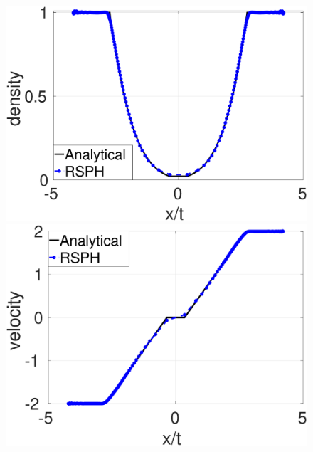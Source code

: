 \begin{figure}[H]
    \begin{minipage}{.495\textwidth}
        \centering
        \includegraphics[width=0.99 \textwidth]{Chapter-4/Figures/Sjogreen/Sjogreen-RCM-rho-Adpt1}
    \end{minipage}%
    \begin{minipage}{.495 \textwidth}
        \centering
        \includegraphics[width=0.99 \textwidth]{Chapter-4/Figures/Sjogreen/Sjogreen-RCM-v-Adpt1}
    \end{minipage}%
    \\
    \begin{minipage}{.495\textwidth}
        \centering

\end{minipage}
\end{figure}
